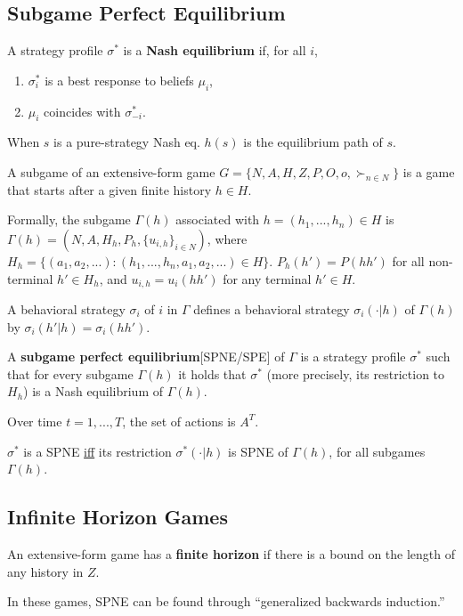 \documentclass[11pt]{elegantbook}
\begin{document}
\subsection{Subgame Perfect Equilibrium}
\begin{definition}
    \normalfont
    A strategy profile $\sigma^*$ is a \textbf{Nash equilibrium} if, for all $i$,
    \begin{enumerate}
        \item $\sigma_i^*$ is a best response to beliefs $\mu_i$,
        \item $\mu_i$ coincides with $\sigma_{-i}^*$.
    \end{enumerate}
\end{definition}
When $s$ is a pure-strategy Nash eq. $h(s)$ is the equilibrium path of $s$.

\begin{definition}
\normalfont
A subgame of an extensive-form game $G=\{N,A,H,Z,P,O,o,\succ_{n\in N}\}$ is a game that starts after a given finite history $h \in H$.

Formally, the subgame $\Gamma(h)$ associated with $h=(h_1,...,h_n)\in H$ is $\Gamma(h)=\left(N,A,H_h,P_h,\{u_{i,h}\}_{i\in N}\right)$, where $H_h=\{(a_1,a_2,...):(h_1,...,h_n,a_1,a_2,...)\in H\}$. $P_h(h')=P(hh')$ for all non-terminal $h'\in H_h$, and $u_{i,h}=u_i(hh')$ for any terminal $h'\in H$.
\end{definition}
A behavioral strategy $\sigma_i$ of $i$ in $\Gamma$ defines a behavioral strategy $\sigma_i(\cdot|h)$ of $\Gamma(h)$ by $\sigma_i(h'|h)=\sigma_i(hh')$.



\begin{definition}
    \normalfont
    A \textbf{subgame perfect equilibrium}[SPNE/SPE] of $\Gamma$ is a strategy profile $\sigma^*$ such that for every subgame $\Gamma(h)$ it holds that $\sigma^*$ (more precisely, its restriction to $H_h$) is a Nash equilibrium of $\Gamma(h)$.
\end{definition}
Over time $t=1,...,T$, the set of actions is $A^T$.
\begin{lemma}
    $\sigma^*$ is a SPNE \underline{iff} its restriction $\sigma^*(\cdot|h)$ is SPNE of $\Gamma(h)$, for all subgames $\Gamma(h)$.
\end{lemma}

\subsection{Infinite Horizon Games}
\begin{definition}
    \normalfont
    An extensive-form game has a \textbf{finite horizon} if there is a bound on the length of any history in $Z$.
\end{definition}
In these games, SPNE can be found through ``generalized backwards induction.''
\end{document}
